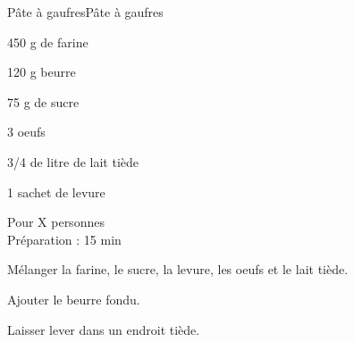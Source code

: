 \begin{recette}{Pâte à  gaufres}{Pâte à  gaufres}

\begin{ingredients}
450 g de farine\par
120 g beurre\par
75 g de sucre\par
3 oeufs\par
3/4 de litre de lait tiède\par
1 sachet de levure\par
\end{ingredients}

\begin{infos}
Pour X personnes\\
Préparation : 15 min\\
\end{infos}

\begin{etapes}
\item %
\item %
\item %
\item Mélanger la farine, le sucre, la levure, les oeufs et le lait tiède.
\item Ajouter le beurre fondu.
\item Laisser lever dans un endroit tiède.
\end{etapes}

\end{recette}